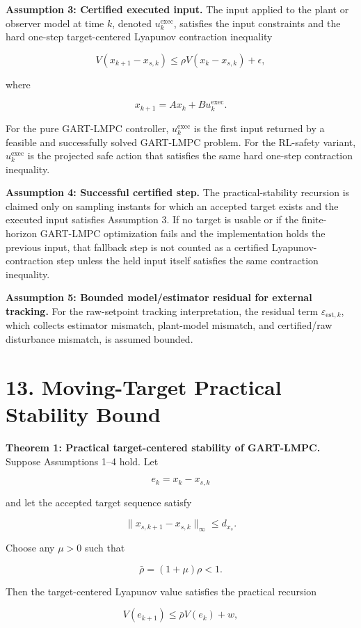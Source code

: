 \documentclass[11pt]{article}
\begin{document}
\textbf{Assumption 3: Certified executed input.}
The input applied to the plant or observer model at time $k$, denoted $u_k^{\mathrm{exec}}$, satisfies the input constraints and the hard one-step target-centered Lyapunov contraction inequality

\[
V(x_{k+1}-x_{s,k})
\le
\rho V(x_k-x_{s,k})+\epsilon,
\]

where

\[
x_{k+1}=Ax_k+Bu_k^{\mathrm{exec}} .
\]

For the pure GART-LMPC controller, $u_k^{\mathrm{exec}}$ is the first input returned by a feasible and successfully solved GART-LMPC problem. For the RL-safety variant, $u_k^{\mathrm{exec}}$ is the projected safe action that satisfies the same hard one-step contraction inequality.

\textbf{Assumption 4: Successful certified step.}
The practical-stability recursion is claimed only on sampling instants for which an accepted target exists and the executed input satisfies Assumption 3. If no target is usable or if the finite-horizon GART-LMPC optimization fails and the implementation holds the previous input, that fallback step is not counted as a certified Lyapunov-contraction step unless the held input itself satisfies the same contraction inequality.

\textbf{Assumption 5: Bounded model/estimator residual for external tracking.}
For the raw-setpoint tracking interpretation, the residual term $\varepsilon_{\mathrm{est},k}$, which collects estimator mismatch, plant-model mismatch, and certified/raw disturbance mismatch, is assumed bounded.


\section*{13. Moving-Target Practical Stability Bound}

\textbf{Theorem 1: Practical target-centered stability of GART-LMPC.}
Suppose Assumptions 1--4 hold. Let

\[
e_k=x_k-x_{s,k}
\]

and let the accepted target sequence satisfy

\[
\|x_{s,k+1}-x_{s,k}\|_\infty\le d_{x_s}.
\]

Choose any $\mu>0$ such that

\[
\bar\rho=(1+\mu)\rho<1 .
\]

Then the target-centered Lyapunov value satisfies the practical recursion

\[
V(e_{k+1})
\le
\bar\rho V(e_k)+w,
\]
\end{document}

